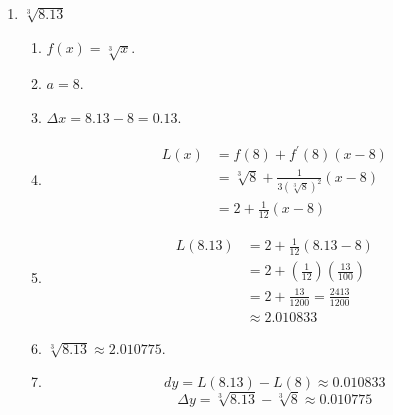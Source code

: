 \documentclass{ximera}
\begin{document}
\begin{problem}
\begin{explanation}
\begin{enumerate}
  \item $ \sqrt[3]{8.13}$
  \begin{enumerate}
    \item  $f(x) = \sqrt[3]{x}$.
    \item  $a=8$.
    \item  $\Delta x = 8.13 - 8 = 0.13$.
    \item 
      \begin{align*}
        L(x) &= f(8) + f^\prime (8) (x-8) \\
             &= \sqrt[3]{8} + \frac{1}{3 (\sqrt[3]{8})^2} \left( x - 8 \right) \\
            &= 2 + \frac{1}{12} (x-8) 
      \end{align*}
    \item  
      \begin{align*}
       L(8.13) &= 2 + \frac{1}{12} (8.13 - 8) \\
                &= 2 + \left( \frac{1}{12} \right) \left( \frac{13}{100} \right) \\
                &= 2 + \frac{13}{1200} = \frac{2413}{1200} \\
                &\approx 2.010833
      \end{align*}
    \item  $\sqrt[3]{8.13} \approx 2.010775$.
    \item  
      $$ dy = L(8.13) - L(8) \approx 0.010833 $$
      $$ \Delta y = \sqrt[3]{8.13} - \sqrt[3]{8} \approx 0.010775 $$
    \end{enumerate}
    \end{enumerate}
\end{explanation}
\end{problem}
\end{document}
